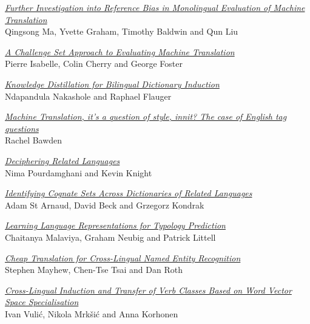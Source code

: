 \hyperlink{page.2459}{\em Further Investigation into Reference Bias in Monolingual Evaluation of Machine Translation}\samepage \\
\hspace*{7mm} Qingsong Ma, Yvette Graham, Timothy Baldwin and Qun Liu\dotfill {}

\hyperlink{page.2469}{\em A Challenge Set Approach to Evaluating Machine Translation}\samepage \\
\hspace*{7mm} Pierre Isabelle, Colin Cherry and George Foster\dotfill {}

\hyperlink{page.2480}{\em Knowledge Distillation for Bilingual Dictionary Induction}\samepage \\
\hspace*{7mm} Ndapandula Nakashole and Raphael Flauger\dotfill {}

\hyperlink{page.2490}{\em Machine Translation, it's a question of style, innit? The case of English tag questions}\samepage \\
\hspace*{7mm} Rachel Bawden\dotfill {}

\hyperlink{page.2496}{\em Deciphering Related Languages}\samepage \\
\hspace*{7mm} Nima Pourdamghani and Kevin Knight\dotfill {}

\hyperlink{page.2502}{\em Identifying Cognate Sets Across Dictionaries of Related Languages}\samepage \\
\hspace*{7mm} Adam St Arnaud, David Beck and Grzegorz Kondrak\dotfill {}

\hyperlink{page.2512}{\em Learning Language Representations for Typology Prediction}\samepage \\
\hspace*{7mm} Chaitanya Malaviya, Graham Neubig and Patrick Littell\dotfill {}

\hyperlink{page.2519}{\em Cheap Translation for Cross-Lingual Named Entity Recognition}\samepage \\
\hspace*{7mm} Stephen Mayhew, Chen-Tse Tsai and Dan Roth\dotfill {}

\hyperlink{page.2529}{\em Cross-Lingual Induction and Transfer of Verb Classes Based on Word Vector Space Specialisation}\samepage \\
\hspace*{7mm} Ivan Vuli\'{c}, Nikola Mrk\v{s}i\'{c} and Anna Korhonen\dotfill {}

